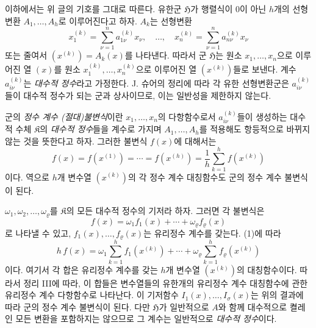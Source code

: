이하에서는 위 글의 기호를 그대로 따른다. 유한군 \(\mathfrak H\)가 행렬식이 0이 아닌 \(h\)개의 선형변환 \(A_1,\ldots,A_h\)로 이루어진다고 하자. \(A_k\)는 선형변환
\[
x_1^{(k)}=\sum_{\nu=1}^{n}a_{1\nu}^{(k)}x_\nu,
\quad\ldots,\quad
x_n^{(k)}=\sum_{\nu=1}^{n}a_{n\nu}^{(k)}x_\nu
\]
또는 줄여서 \((x^{(k)})=A_k(x)\)를 나타낸다. 따라서 군 \(\mathfrak H\)는 원소 \(x_1,\ldots,x_n\)으로 이루어진 열 \((x)\)를 원소 \(x_1^{(k)},\ldots,x_n^{(k)}\)으로 이루어진 열 \((x^{(k)})\)들로 보낸다. 계수 \(a_{i\nu}^{(k)}\)는 \emph{대수적 정수}라고 가정한다. J. 슈어의 정리에 따라 각 유한 선형변환군은 \(a_{i\nu}^{(k)}\)들이 대수적 정수가 되는 군과 상사이므로, 이는 일반성을 제한하지 않는다.

군의 \emph{정수 계수 (절대)불변식}이란 \(x_1,\ldots,x_n\)의 다항함수로서 \(a_{i\nu}^{(k)}\)들이 생성하는 대수적 수체 \(\mathfrak K\)의 \emph{대수적 정수}들을 계수로 가지며 \(A_1,\ldots,A_h\)를 적용해도 항등적으로 바뀌지 않는 것을 뜻한다고 하자. 그러한 불변식 \(f(x)\)에 대해서는
\begin{equation}
\tag{1}
f(x)=f(x^{(1)})=\cdots=f(x^{(h)})
=\frac1h\sum_{k=1}^{h}f(x^{(k)})
\end{equation}
이다. 역으로 \(h\)개 변수열 \((x^{(k)})\)의 각 정수 계수 대칭함수도 군의 정수 계수 불변식이 된다.

\(\omega_1,\omega_2,\ldots,\omega_\varrho\)를 \(\mathfrak K\)의 모든 대수적 정수의 기저라 하자. 그러면 각 불변식은
\[
f(x)=\omega_1f_1(x)+\cdots+\omega_\varrho f_\varrho(x)
\]
로 나타낼 수 있고, \(f_1(x),\ldots,f_\varrho(x)\)는 유리정수 계수를 갖는다. (1)에 따라
\[
h\,f(x)=
\omega_1\sum_{k=1}^{h}f_1(x^{(k)})+\cdots+
\omega_\varrho\sum_{k=1}^{h}f_\varrho(x^{(k)})
\]
이다. 여기서 각 합은 유리정수 계수를 갖는 \(h\)개 변수열 \((x^{(k)})\)의 대칭함수이다. 따라서 정리 III에 따라, 이 합들은 변수열들의 유한개의 유리정수 계수 대칭함수에 관한 유리정수 계수 다항함수로 나타난다. 이 기저함수 \(I_1(x),\ldots,I_\sigma(x)\)는 위의 결과에 따라 군의 정수 계수 불변식이 된다. 다만 \(\mathfrak H\)가 일반적으로 \(A\)와 함께 대수적으로 켤레인 모든 변환을 포함하지는 않으므로 그 계수는 일반적으로 \emph{대수적 정수}이다.

